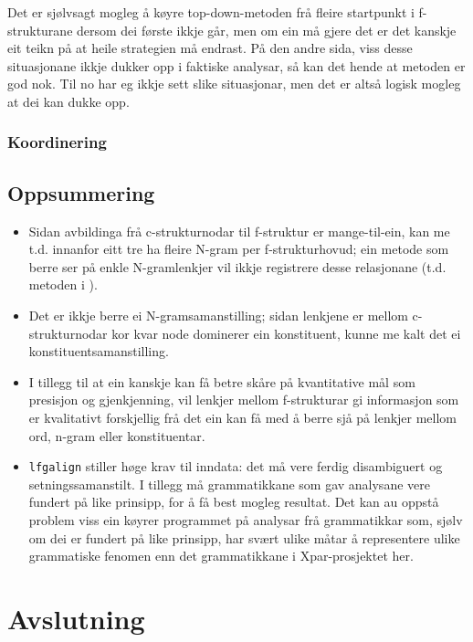 \documentclass[11pt,a4paper,oneside,draft]{book}
\begin{document}
 Det er sjølvsagt mogleg å køyre top-down-metoden frå fleire
 startpunkt i f-strukturane dersom dei første ikkje går, men om ein må
 gjere det er det kanskje eit teikn på at heile strategien må
 endrast. På den andre sida, viss desse situasjonane ikkje dukker opp
 i faktiske analysar, så kan det hende at metoden er god nok. Til no
 har eg ikkje sett slike situasjonar, men det er altså logisk mogleg
 at dei kan dukke opp.
\subsection{Koordinering}
\label{sec-5.5.2}

\section{Oppsummering}
\label{sec-5.6}

\begin{itemize}
\item Sidan avbildinga frå c-strukturnodar til f-struktur er
   mange-til-ein, kan me t.d. innanfor eitt tre ha fleire N-gram per
   f-strukturhovud; ein metode som berre ser på enkle N-gramlenkjer
   vil ikkje registrere desse relasjonane (t.d. metoden i
   \citet{samuelsson2007apa}).
\item Det er ikkje berre ei N-gramsamanstilling; sidan
   lenkjene er mellom c-strukturnodar kor kvar node dominerer ein
   konstituent, kunne me kalt det ei konstituentsamanstilling.
\item I tillegg til at ein kanskje kan få betre skåre på kvantitative mål
   som presisjon og gjenkjenning, vil lenkjer mellom f-strukturar gi
   informasjon som er kvalitativt forskjellig frå det ein kan få med å
   berre sjå på lenkjer mellom ord, n-gram eller konstituentar.
\item \texttt{lfgalign} stiller høge krav til inndata: det må vere ferdig
   disambiguert og setningssamanstilt. I tillegg må grammatikkane som
   gav analysane vere fundert på like prinsipp, for å få best mogleg
   resultat. Det kan au oppstå problem viss ein køyrer programmet på
   analysar frå grammatikkar som, sjølv om dei er fundert på like
   prinsipp, har svært ulike måtar å representere ulike grammatiske
   fenomen enn det grammatikkane i Xpar-prosjektet her.
\end{itemize}
\chapter{Avslutning}
\label{sec-6}




\end{document}
